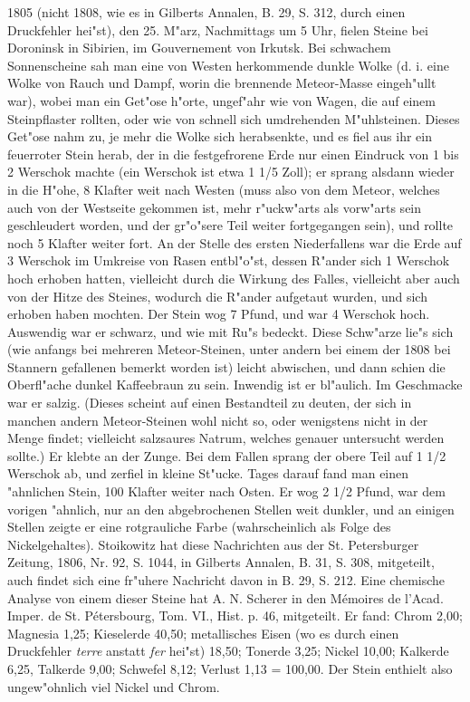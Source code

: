 \documentclass[a4paper, 11pt, oneside, polutonikogreek, german]{article}
\begin{document}
1805 (nicht 1808, wie es in Gilberts Annalen, B. 29, S. 312, durch einen Druckfehler hei"st), den 25. M"arz, Nachmittags um 5 Uhr, fielen Steine bei Doroninsk in Sibirien, im Gouvernement von Irkutsk. Bei schwachem Sonnenscheine sah man eine von Westen herkommende dunkle Wolke (d. i. eine Wolke von Rauch und Dampf, worin die brennende Meteor-Masse eingeh"ullt war), wobei man ein Get"ose h"orte, ungef"ahr wie von Wagen, die auf einem Steinpflaster rollten, oder wie von schnell sich umdrehenden M"uhlsteinen. Dieses Get"ose nahm zu, je mehr die Wolke sich herabsenkte, und es fiel aus ihr ein feuerroter Stein herab, der in die festgefrorene Erde nur einen Eindruck von 1 bis 2 Werschok machte (ein Werschok ist etwa 1 1/5 Zoll); er sprang alsdann wieder in die H"ohe, 8 Klafter weit nach Westen (muss also von dem Meteor, welches auch von der Westseite gekommen ist, mehr r"uckw"arts als vorw"arts sein geschleudert worden, und der gr"o"sere Teil weiter fortgegangen sein), und rollte noch 5 Klafter weiter fort. An der Stelle des ersten Niederfallens war die Erde auf 3 Werschok im Umkreise von Rasen entbl"o"st, dessen R"ander sich 1 Werschok hoch erhoben hatten, vielleicht durch die Wirkung des Falles, vielleicht aber auch von der Hitze des Steines, wodurch die R"ander aufgetaut wurden, und sich erhoben haben mochten. Der Stein wog 7 Pfund, und war 4 Werschok hoch. Auswendig war er schwarz, und wie mit Ru"s bedeckt. Diese Schw"arze lie"s sich (wie anfangs bei mehreren Meteor-Steinen, unter andern bei einem der 1808 bei Stannern gefallenen bemerkt worden ist) leicht abwischen, und dann schien die Oberfl"ache dunkel Kaffeebraun zu sein. Inwendig ist er bl"aulich. Im Geschmacke war er salzig. (Dieses scheint auf einen Bestandteil zu deuten, der sich in manchen andern Meteor-Steinen wohl nicht so, oder wenigstens nicht in der Menge findet; vielleicht salzsaures Natrum, welches genauer untersucht werden sollte.) Er klebte an der Zunge. Bei dem Fallen sprang der obere Teil auf 1 1/2 Werschok ab, und zerfiel in kleine St"ucke. Tages darauf fand man einen "ahnlichen Stein, 100 Klafter weiter nach Osten. Er wog 2 1/2 Pfund, war dem vorigen "ahnlich, nur an den abgebrochenen Stellen weit dunkler, und an einigen Stellen zeigte er eine rotgrauliche Farbe (wahrscheinlich als Folge des Nickelgehaltes). Stoikowitz hat diese Nachrichten aus der St. Petersburger Zeitung, 1806, Nr. 92, S. 1044, in Gilberts Annalen, B. 31, S. 308, mitgeteilt, auch findet sich eine fr"uhere Nachricht davon in B. 29, S. 212. Eine chemische Analyse von einem dieser Steine hat A. N. Scherer in den Mémoires de l'Acad. Imper. de St. Pétersbourg, Tom. VI., Hist. p. 46, mitgeteilt. Er fand: Chrom 2,00; Magnesia 1,25; Kieselerde 40,50; metallisches Eisen (wo es durch einen Druckfehler \emph{terre} anstatt \emph{fer} hei"st) 18,50; Tonerde 3,25; Nickel 10,00; Kalkerde 6,25, Talkerde 9,00; Schwefel 8,12; Verlust 1,13 = 100,00. Der Stein enthielt also ungew"ohnlich viel Nickel und Chrom.
\end{document}
